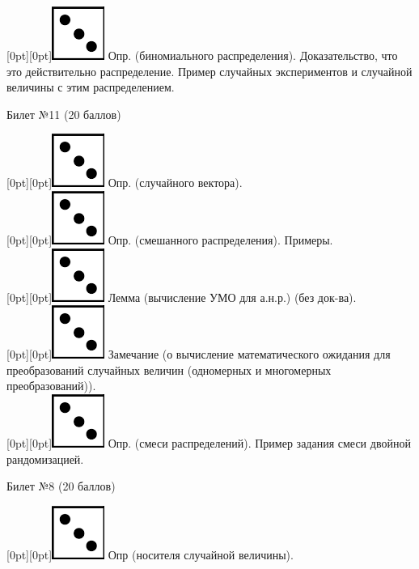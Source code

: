 \documentclass[10pt]{article}
\begin{document}
\raisebox{-1pt}[0pt][0pt]{\includegraphics[width=0.02\linewidth]{3.png}}  Опр. (биномиального распределения). Доказательство, что это действительно распределение. Пример случайных экспериментов и случайной величины с этим распределением. \\     

\begin{center} {\Large Билет №11 (20 баллов)} \end{center}

\raisebox{-1pt}[0pt][0pt]{\includegraphics[width=0.02\linewidth]{3.png}} Опр. (случайного вектора). \\

\raisebox{-1pt}[0pt][0pt]{\includegraphics[width=0.02\linewidth]{3.png}} Опр. (смешанного распределения). Примеры. \\

\raisebox{-1pt}[0pt][0pt]{\includegraphics[width=0.02\linewidth]{3.png}} Лемма (вычисление УМО для а.н.р.)  (без док-ва). \\

\raisebox{-1pt}[0pt][0pt]{\includegraphics[width=0.02\linewidth]{3.png}} Замечание (о вычисление  математического ожидания для преобразований случайных величин (одномерных и многомерных преобразований)). \\

\raisebox{-1pt}[0pt][0pt]{\includegraphics[width=0.02\linewidth]{3.png}}  Опр. (смеси распределений). Пример задания смеси двойной рандомизацией. \\

\begin{center} {\Large Билет №8 (20 баллов)} \end{center}

\raisebox{-1pt}[0pt][0pt]{\includegraphics[width=0.02\linewidth]{3.png}} Опр (носителя случайной величины). \\
\end{document}
